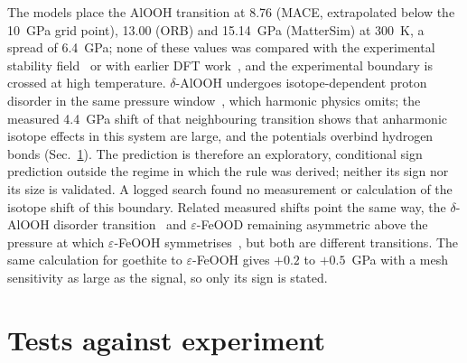 \documentclass[aps,prmaterials,reprint,superscriptaddress,nofootinbib]{revtex4-2}
\begin{document}
The models place the AlOOH transition at 8.76 (MACE, extrapolated below the 10~GPa grid point), 13.00 (ORB) and 15.14~GPa (MatterSim) at 300~K, a spread of 6.4~GPa; none of these values was compared with the experimental stability field~\cite{Ohtani2001} or with earlier DFT work~\cite{Tsuchiya2002}, and the experimental boundary is crossed at high temperature. $\delta$-AlOOH undergoes isotope-dependent proton disorder in the same pressure window~\cite{SanoFurukawa2008,SanoFurukawa2018}, which harmonic physics omits; the measured 4.4~GPa shift of that neighbouring transition shows that anharmonic isotope effects in this system are large, and the potentials overbind hydrogen bonds (Sec.~\ref{sec:tests}). The prediction is therefore an exploratory, conditional sign prediction outside the regime in which the rule was derived; neither its sign nor its size is validated. A logged search found no measurement or calculation of the isotope shift of this boundary. Related measured shifts point the same way, the $\delta$-AlOOH disorder transition~\cite{SanoFurukawa2018} and $\varepsilon$-FeOOD remaining asymmetric above the pressure at which $\varepsilon$-FeOOH symmetrises~\cite{Ikeda2025}, but both are different transitions. The same calculation for goethite to $\varepsilon$-FeOOH gives $+0.2$ to $+0.5$~GPa with a mesh sensitivity as large as the signal, so only its sign is stated.

\section{Tests against experiment}
\label{sec:tests}
\end{document}
